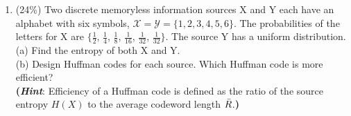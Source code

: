 \documentclass[a4paper,12pt]{article}
\begin{document}
\begin{enumerate}
            Three equiprobable messages $m_1$, $m_2$ and $m_3$ are to be transmitted over an AWGN channel with noise power spectral density $\frac{1}{2}N_0$. The messages are 
            \begin{align*}
                s_1(t) = \left\{
                \begin{aligned}
                    & 1 \;\;\;\; 0 \leq t \leq T \\ 
                    & 0 \;\;\;\; \text{otherwise}
                \end{aligned}
                \right.
                \;\;\;\;\;\;
                s_2(t) = -s_3(t) \left\{
                \begin{aligned}
                     &1  \;\;\;\; 0 \leq t \leq \frac{1}{2}T \\ 
                    -&1 \;\;\;\; \frac{1}{2}T < t \leq T \\
                     &0  \;\;\;\; \text{otherwise}
                \end{aligned}
                \right.
            \end{align*}
            (a) What is the dimensionality of the signal space? \\ 
            (b) Find an appropriate basis for the signal space. \\ 
            (c) Please Draw the signal constellation of the messages $m_1$, $m_2$, $m_3$ and the optimal decision regions $R_1$, $R_2$, $R_3$ for this problem. \\ 
            (d) Which of the three messages is most vulnerable to errors and why? In other words, which of $P(\text{error} \ | \ m_i \; \text{transmitted}), \ i = 1, 2, 3$, is largest? \\ 
        \item (24\%)
            Two discrete memoryless information sources X and Y each have an alphabet with six symbols, $\mathcal{X} = \mathcal{Y} = \{ 1, 2, 3, 4, 5, 6 \}$. 
            The probabilities of the letters for X are $\{ \frac{1}{2}$, $\frac{1}{4}$, $\frac{1}{8}$, $\frac{1}{16}$, $\frac{1}{32}$, $\frac{1}{32} \}$. The source Y has a uniform distribution. \\ 
            (a) Find the entropy of both X and Y. \\ 
            (b) Design Huffman codes for each source. Which Huffman code is more efficient? \\
            \textbf{(\textit{Hint}}: Efficiency of a Huffman code is defined as the ratio of the source entropy $H(X)$ to the average codeword length $\Bar{R}$.\textbf{)} \\ 

\end{enumerate}
\end{document}

